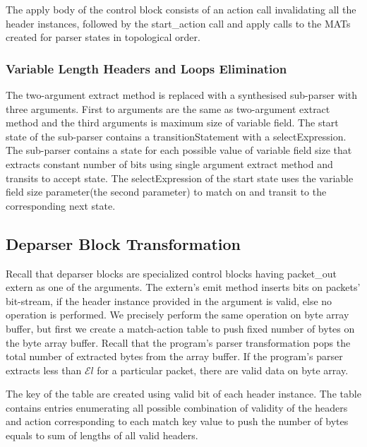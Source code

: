 \documentclass{hotnets19}
\begin{document}
The apply body of the control block consists of an action call invalidating all the header instances, followed by the start\_action call and apply calls to the MATs created for parser states in topological order.



\subsubsection{Variable Length Headers and Loops Elimination}
\label{variable-length-headers-loops-and-elimination}
The two-argument extract method is replaced with a synthesised sub-parser with three arguments.
First to arguments are the same as two-argument extract method and the third arguments is maximum size of variable field.
The start state of the sub-parser contains a transition\-Statement with a select\-Expression.
The sub-parser contains a state for each possible value of variable field size that extracts constant number of bits using single argument extract method and transits to accept state.
The select\-Expression of the start state uses the variable field size parameter(the second parameter) to match on and transit to the corresponding next state.




\subsection{Deparser Block Transformation}
\label{subsection:deparser-block-transformation}
Recall that deparser blocks are specialized control blocks having packet\_out extern as one of the arguments.
The extern's emit method inserts bits on packets' bit-stream, if the header instance provided in the argument is valid, else no operation is performed.
We precisely perform the same operation on byte array buffer, but first we create a match-action table to push fixed number of bytes on the byte array buffer.
Recall that the program's parser transformation pops the total number of extracted bytes from the array buffer.
If the program's parser extracts less than $\mathcal{E}l$ for a particular packet, there are valid data on byte array.

The key of the table are created using valid bit of each header instance.
The table contains entries enumerating all possible combination of validity of the headers and action corresponding to each match key value to push the number of bytes equals to sum of lengths of all valid headers.
\end{document}
